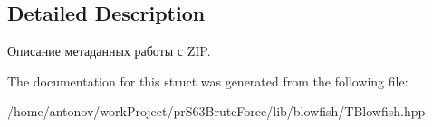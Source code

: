 \subsection{Detailed Description}
Описание метаданных работы с Z\+IP. 

The documentation for this struct was generated from the following file\+:\begin{DoxyCompactItemize}
\item 
/home/antonov/work\+Project/pr\+S63\+Brute\+Force/lib/blowfish/T\+Blowfish.\+hpp\end{DoxyCompactItemize}
